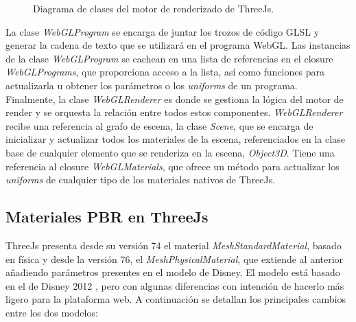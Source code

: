 \begin{figure}[H]
  \vspace{0.5cm}
  \centering
  \caption{Diagrama de clases del motor de renderizado de ThreeJs.}
\end{figure}

La clase \textit{WebGLProgram} se encarga de juntar los trozos de c\'odigo GLSL y generar la cadena de texto que se utilizar\'a en
el programa WebGL. Las instancias de la clase \textit{WebGLProgram} se cachean en una lista de referencias en el closure \textit{WebGLPrograms}, que proporciona
acceso a la lista, as\'i como funciones para actualizarla u obtener los par\'ametros o los \textit{uniforms} de un programa. \\

Finalmente, la clase \textit{WebGLRenderer} es donde se gestiona la l\'ogica del motor de render y se orquesta la relaci\'on entre todos
estos componentes. \textit{WebGLRenderer} recibe una referencia al grafo de escena, la clase \textit{Scene}, que se encarga de inicializar
y actualizar todos los materiales de la escena, referenciados en la clase base de cualquier elemento que se renderiza en la escena, \textit{Object3D}.
Tiene una referencia al closure \textit{WebGLMaterials}, que ofrece un m\'etodo para actualizar los \textit{uniforms} de cualquier tipo
de los materiales nativos de ThreeJs.





\subsection{Materiales PBR en ThreeJs}
ThreeJs presenta desde su versi\'on 74 el material \textit{MeshStandardMaterial}, basado en f\'isica y desde la versi\'on
76, el \textit{MeshPhysicalMaterial}, que extiende al anterior a\~nadiendo par\'ametros presentes en el modelo de Disney.
El modelo est\'a basado en el de Disney 2012 \autocite{disney12}, pero con algunas diferencias con intenci\'on de hacerlo m\'as ligero
para la plataforma web. A continuaci\'on se detallan los principales cambios entre los dos modelos:

